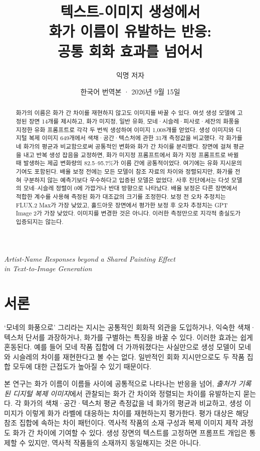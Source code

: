 \documentclass[11pt,a4paper]{article}
\title{텍스트-이미지 생성에서\\화가 이름이 유발하는 반응:\\공통 회화 효과를 넘어서}
\author{익명 저자}
\date{한국어 번역본 · 2026년 9월 15일}
\begin{document}
\maketitle
\thispagestyle{plain}
\begin{center}
\textit{Artist-Name Responses beyond a Shared Painting Effect\\in Text-to-Image Generation}
\end{center}
\begin{abstract}
화가의 이름은 화가 간 차이를 재현하지 않고도 이미지를 바꿀 수 있다. 여섯 생성 모델에 고정된 장면 14개를 제시하고, 화가 미지정, 일반 유화, 모네·시슬레·피사로·세잔의 화풍을 지정한 유화 프롬프트로 각각 두 번씩 생성하여 이미지 1,008개를 얻었다. 생성 이미지와 디지털 복제 이미지 649개에서 색채·공간·텍스처에 관한 31개 측정값을 비교했다. 각 화가를 네 화가의 평균과 비교함으로써 공통적인 변화와 화가 간 차이를 분리했다. 장면에 걸쳐 평균을 내고 반복 생성 잡음을 교정하면, 화가 미지정 프롬프트에서 화가 지정 프롬프트로 바뀔 때 발생하는 제곱 변화량의 82.5--95.7\%가 이름 간에 공통적이었다. 여기에는 유화 지시문의 기여도 포함된다. 배율 보정 전에는 모든 모델이 참조 자료의 차이와 정렬되지만, 화가를 전혀 구분하지 않는 예측기보다 우수하다고 입증된 모델은 없었다. 사후 진단에서는 다섯 모델의 모네--시슬레 정렬이 0에 가깝거나 반대 방향으로 나타났다. 배율 보정은 다른 장면에서 적합한 계수를 사용해 측정된 화가 대조값의 크기를 조정한다. 보정 전 오차 추정치는 FLUX.2 Max가 가장 낮았고, 홀드아웃 장면에서 평가한 보정 후 오차 추정치는 GPT Image 2가 가장 낮았다. 이미지를 변경한 것은 아니다. 이러한 측정만으로 지각적 충실도가 입증되지는 않는다.
\end{abstract}
\clearpage
{\small\linespread{0.95}\selectfont
\setlength{\parskip}{0pt}
\tableofcontents}
\clearpage

\section{서론}
‘모네의 화풍으로’ 그리라는 지시는 공통적인 회화적 외관을 도입하거나, 익숙한 색채·텍스처 단서를 과장하거나, 화가를 구별하는 특징을 바꿀 수 있다. 이러한 효과는 쉽게 혼동된다. 예를 들어 모네 작품 집합에 더 가까워졌다는 사실만으로 생성 모델이 모네와 시슬레의 차이를 재현한다고 볼 수는 없다. 일반적인 회화 지시만으로도 두 작품 집합 모두에 대한 근접도가 높아질 수 있기 때문이다.

본 연구는 화가 이름이 이름들 사이에 공통적으로 나타나는 반응을 넘어, \emph{출처가 기록된 디지털 복제 이미지}에서 관찰되는 화가 간 차이와 정렬되는 차이를 유발하는지 묻는다. 각 화가의 색채·공간·텍스처 평균 측정값을 네 화가의 평균과 비교하고, 생성 이미지가 이렇게 화가 라벨에 대응하는 차이를 재현하는지 평가한다. 평가 대상은 해당 참조 집합에 속하는 차이 패턴이다. 역사적 작품의 소재 구성과 복제 이미지 제작 과정도 화가 간 차이에 기여할 수 있다. 생성 장면의 텍스트를 고정하면 프롬프트 개입은 통제할 수 있지만, 역사적 작품들의 소재까지 동일해지는 것은 아니다.
\end{document}
